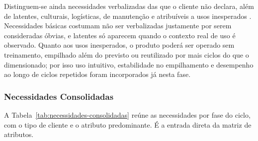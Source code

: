 Distinguem-se ainda necessidades verbalizadas das que o cliente não declara, além de latentes, culturais, logísticas, de manutenção e atribuíveis a usos inesperados \citep{back2008,fonseca2000}. Necessidades básicas costumam não ser verbalizadas justamente por serem consideradas óbvias, e latentes só aparecem quando o contexto real de uso é observado. Quanto aos usos inesperados, o produto poderá ser operado sem treinamento, empilhado além do previsto ou reutilizado por mais ciclos do que o dimensionado; por isso uso intuitivo, estabilidade no empilhamento e desempenho ao longo de ciclos repetidos foram incorporados já nesta fase.

\subsubsection{Necessidades Consolidadas}

A Tabela~\ref{tab:necessidades-consolidadas} reúne as necessidades por fase do ciclo, com o tipo de cliente e o atributo predominante. É a entrada direta da matriz de atributos.


